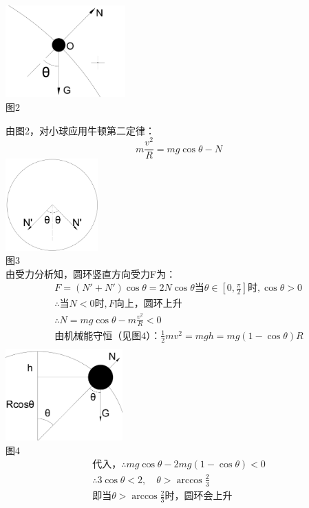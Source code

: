 \documentclass[b5paper,opensource]{qyxf-book}
\begin{document}

{\centering\includegraphics[height=100pt]{Chp2_illus2.png}}\\
图2

由图2，对小球应用牛顿第二定律：
\[m\frac{v^2}{R}=mg\cos\theta-N\]
{\centering\includegraphics[height=100pt]{Chp2_illus3.png}}\\
图3\\

由受力分析知，圆环竖直方向受力F为：
\begin{gather*}
F=(N'+N')\cos\theta=2N\cos\theta
\text{当}\theta\in[0,\frac{\pi}{2}]\text{时},\cos\theta>0\\
\therefore\text{当}N<0\text{时},F\text{向上，圆环上升}\\
\therefore N=mg\cos\theta-m\frac{v^2}{R}<0\\
\text{由机械能守恒（见图4）：}\frac{1}{2}mv^2=mgh=mg(1-\cos\theta)R\\
\end{gather*}
{\centering\includegraphics[height=100pt]{Chp2_illus4.png}}\\
图4
\begin{gather*}
\text{代入，}\therefore mg\cos\theta-2mg(1-\cos\theta)<0\\
\therefore 3\cos\theta<2,\quad \theta>\arccos\frac{2}{3}\\
\text{即当}\theta>\arccos\frac{2}{3}\text{时，圆环会上升}
\end{gather*}
\end{document}
